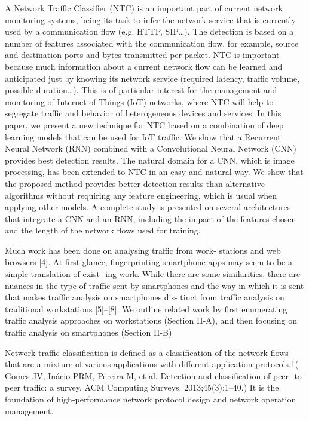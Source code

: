\documentclass[10pt,journal,compsoc]{IEEEtran}
\begin{document}
  \cite{Lopez-Martin2017}
A Network Traffic Classifier (NTC) is an important
part of current network monitoring systems, being its task to infer the network service that is currently used by a communication flow (e.g. HTTP, SIP…). The detection is based on a number of features associated with the communication flow, for example, source and destination ports and bytes transmitted per packet. NTC is important because much information about a current network flow can be learned and anticipated just by knowing its network service (required latency, traffic volume, possible duration…). This is of particular interest for the management and monitoring of Internet of Things (IoT) networks, where NTC will help to segregate traffic and behavior of heterogeneous devices and services. In this paper, we present a new technique for NTC based on a combination of deep learning models that can be used for IoT traffic. We show that a Recurrent Neural Network (RNN) combined with a Convolutional Neural Network (CNN) provides best detection results. The natural domain for a CNN, which is image processing, has been extended to NTC in an easy and natural way. We show that the proposed method provides better detection results than alternative algorithms without requiring any feature engineering, which is usual when applying other models. A complete study is presented on several architectures that integrate a CNN and an RNN, including the impact of the features chosen and the length of the network flows used for training.

\cite{Taylor2018}
Much work has been done on analysing traffic from work-
stations and web browsers [4]. At first glance, fingerprinting smartphone apps may seem to be a simple translation of exist- ing work. While there are some similarities, there are nuances in the type of traffic sent by smartphones and the way in which it is sent that makes traffic analysis on smartphones dis- tinct from traffic analysis on traditional workstations [5]–[8]. We outline related work by first enumerating traffic analysis approaches on workstations (Section II-A), and then focusing on traffic analysis on smartphones (Section II-B)

\cite{Anderson2017}

\cite{Cao2017}
Network traffic classification is defined as a classification of
the network flows that are a mixture of various applications
with different application protocols.1( Gomes JV, Inácio PRM, Pereira M, et al. Detection and classification of peer‐
to‐peer traffic: a survey. ACM Computing Surveys. 2013;45(3):1–40.) It is the foundation of
high‐performance network protocol design and network operation management.
\end{document}
